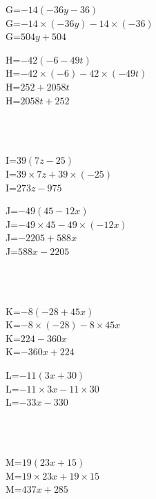 \documentclass{article}%
\begin{document}
\begin{minipage}{0.5\textwidth}%
G=$-14(-36y-36)$\\%
G=$-14 \times (-36y)-14 \times (-36)$\\%
G=$504y+504$\\%
\end{minipage}%
\begin{minipage}{0.5\textwidth}%
H=$-42(-6-49t)$\\%
H=$-42 \times (-6)-42 \times (-49t)$\\%
H=$252+2058t$\\%
H=$2058t+252$\\%
\end{minipage}%
\\%
\\%
\begin{minipage}{0.5\textwidth}%
I=$39(7z-25)$\\%
I=$39 \times 7z+39 \times (-25)$\\%
I=$273z-975$\\%
\end{minipage}%
\begin{minipage}{0.5\textwidth}%
J=$-49(45-12x)$\\%
J=$-49 \times 45-49 \times (-12x)$\\%
J=$-2205+588x$\\%
J=$588x-2205$\\%
\end{minipage}%
\\%
\\%
\begin{minipage}{0.5\textwidth}%
K=$-8(-28+45x)$\\%
K=$-8 \times (-28)-8 \times 45x$\\%
K=$224-360x$\\%
K=$-360x+224$\\%
\end{minipage}%
\begin{minipage}{0.5\textwidth}%
L=$-11(3x+30)$\\%
L=$-11 \times 3x-11 \times 30$\\%
L=$-33x-330$\\%
\end{minipage}%
\\%
\\%
\begin{minipage}{0.5\textwidth}%
M=$19(23x+15)$\\%
M=$19 \times 23x+19 \times 15$\\%
M=$437x+285$\\%
\end{minipage}%
\end{document}
